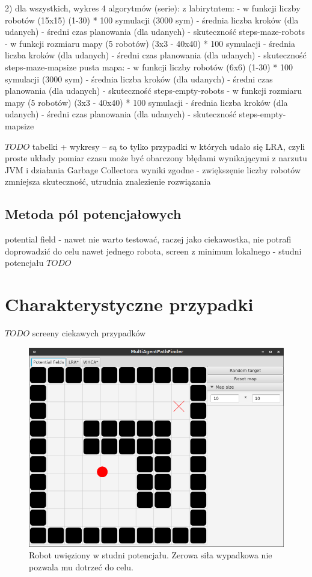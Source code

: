 2) dla wszystkich, wykres 4 algorytmów (serie):
	z labirytntem:
		- w funkcji liczby robotów (15x15) (1-30) * 100 symulacji (3000 sym) %
			- średnia liczba kroków (dla udanych)
			- średni czas planowania (dla udanych)
			- skuteczność
				steps-maze-robots
		- w funkcji rozmiaru mapy (5 robotów) (3x3 - 40x40) * 100 symulacji %
			- średnia liczba kroków (dla udanych)
			- średni czas planowania (dla udanych)
			- skuteczność
				steps-maze-mapsize
	pusta mapa:
		- w funkcji liczby robotów (6x6) (1-30) * 100 symulacji (3000 sym) %
			- średnia liczba kroków (dla udanych)
			- średni czas planowania (dla udanych)
			- skuteczność
				steps-empty-robots
		- w funkcji rozmiaru mapy (5 robotów) (3x3 - 40x40) * 100 symulacji %
			- średnia liczba kroków (dla udanych)
			- średni czas planowania (dla udanych)
			- skuteczność
				steps-empty-mapsize

$TODO$ tabelki + wykresy
-- są to tylko przypadki w których udało się LRA, czyli proste układy
pomiar czasu może być obarczony błędami wynikającymi z narzutu JVM i działania Garbage Collectora
wyniki zgodne - zwiększęnie liczby robotów zmniejsza skuteczność, utrudnia znalezienie rozwiązania

\subsection{Metoda pól potencjałowych}
potential field - nawet nie warto testować, raczej jako ciekawostka, nie potrafi doprowadzić do celu nawet jednego robota, screen z minimum lokalnego - studni potencjału
$TODO$

\section{Charakterystyczne przypadki}
$TODO$ screeny ciekawych przypadków

\begin{figure}
	\centering
	\includegraphics[width=0.8\columnwidth]{img/robopath/field-potential-hole}
	\caption{Robot uwięziony w studni potencjału. Zerowa siła wypadkowa nie pozwala mu dotrzeć do celu.}
	\label{fig:test-field-potential-hole}
\end{figure}

